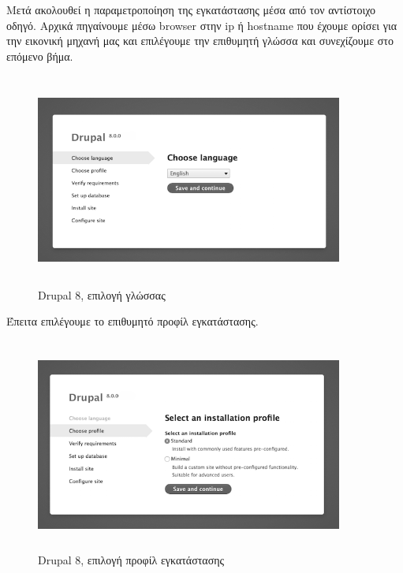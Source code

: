 \documentclass[12pt]{report}
\begin{document}
Μετά ακολουθεί η παραμετροποίηση της εγκατάστασης μέσα από τον αντίστοιχο οδηγό. Αρχικά πηγαίνουμε μέσω \textlatin{browser} στην \textlatin{ip} ή \textlatin{hostname} που έχουμε ορίσει για την εικονική μηχανή μας και επιλέγουμε την επιθυμητή γλώσσα και συνεχίζουμε στο επόμενο βήμα.
\begin{figure}[H]
\centering
\includegraphics[width=0.9\textwidth, height=7cm]{drupal-choose-language-gray}
\caption{\textlatin{Drupal 8}, επιλογή γλώσσας}
\label{fig:drupal_lang}
\end{figure}

Έπειτα επιλέγουμε το επιθυμητό προφίλ εγκατάστασης.
\begin{figure}[H]
\centering
\includegraphics[width=0.9\textwidth, height=7cm]{drupal-choose-installation-profile-gray}
\caption{\textlatin{Drupal 8}, επιλογή προφίλ εγκατάστασης}
\label{fig:drupal_profile}
\end{figure}
\end{document}
